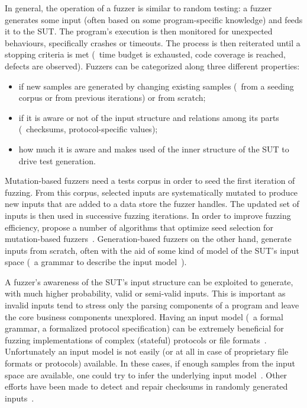 In general, the operation of a fuzzer is similar to random testing: a fuzzer
generates some input (often based on some program-specific knowledge) and feeds
it to the \ac{SUT}. The program's execution is then monitored for unexpected
behaviours, specifically crashes or timeouts. The process is then reiterated
until a stopping criteria is met (\eg~time budget is exhausted, code coverage
is reached, defects are observed). Fuzzers can be categorized along three
different properties:

\begin{itemize}
    \item if new samples are generated by changing existing samples (\eg~from
        a seeding corpus or from previous iterations) or from scratch;
    \item if it is aware or not of the input structure and relations among its
        parts (\eg~checksums, protocol-specific values);
    \item how much it is aware and makes used of the inner structure of the
        \ac{SUT} to drive test generation.
\end{itemize}

Mutation-based fuzzers need a tests corpus in order to seed the first iteration
of fuzzing. From this corpus, selected inputs are systematically mutated to
produce new inputs that are added to a data store the fuzzer handles. The
updated set of inputs is then used in successive fuzzing iterations. In order to
improve fuzzing efficiency, \citeauthor{rebert2014optimizing} propose a number
of algorithms that optimize seed selection for mutation-based
fuzzers~\cite{rebert2014optimizing}. Generation-based fuzzers on the other hand,
generate inputs from scratch, often with the aid of some kind of model of the
\ac{SUT}'s input space (\eg~a grammar to describe the input
model~\cite{godefroid2008grammar}).

A fuzzer's awareness of the \ac{SUT}'s input structure can be exploited to
generate, with much higher probability, valid or semi-valid inputs. This is
important as invalid inputs tend to stress only the parsing components of a
program and leave the core business components unexplored. Having an input model
(\eg~a formal grammar, a formalized protocol specification) can be extremely
beneficial for fuzzing implementations of complex (stateful) protocols or file
formats~\cite{banks2006snooze, pham2016model}. Unfortunately an input model is
not easily (or at all in case of proprietary file formats or protocols)
available. In these cases, if enough samples from the input space are available,
one could try to infer the underlying input model~\cite{bastani2017synthesizing,
godefroid2017learn}. Other efforts have been made to detect and repair checksums
in randomly generated inputs~\cite{wang2010taintscope}.

